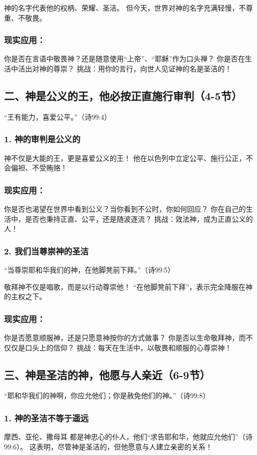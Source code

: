 \documentclass[a4paper, 12pt]{article}
\begin{document}
神的名字代表他的权柄、荣耀、圣洁。
但今天，世界对神的名字充满轻慢，不尊重、不敬畏。
\subsubsection*{现实应用：}

你是否在言语中敬畏神？还是随意使用“上帝”、“耶稣”作为口头禅？
你是否在生活中活出对神的尊崇？
挑战：用你的言行，向世人见证神的名是圣洁的！

\subsection*{二、神是公义的王，他必按正直施行审判（4-5节）}
“王有能力，喜爱公平。”（诗99:4）

\subsubsection*{1. 神的审判是公义的}
神不仅是大能的王，更是喜爱公义的王！
他在以色列中立定公平、施行公正，不会偏袒、不受贿赂！
\subsubsection*{现实应用：}

你是否也渴望在世界中看到公义？当你看到不公时，你如何回应？
你在自己的生活中，是否也秉持正直、公平，还是随波逐流？
挑战：效法神，成为正直公义的人！

\subsubsection*{2. 我们当尊崇神的圣洁}
“当尊崇耶和华我们的神，在他脚凳前下拜。”（诗99:5）

敬拜神不仅是唱歌，而是以行动尊崇他！
“在他脚凳前下拜”，表示完全降服在神的主权之下。
\subsubsection*{现实应用：}

你是否愿意顺服神，还是只愿意神按你的方式做事？
你是否以生命敬拜神，而不仅仅是口头上的信仰？
挑战：每天在生活中，以敬畏和顺服的心尊崇神！

\subsection*{三、神是圣洁的神，他愿与人亲近（6-9节）}
“耶和华我们的神啊，你应允他们；你是赦免他们的神。”（诗99:8）

\subsubsection*{1. 神的圣洁不等于遥远}
摩西、亚伦、撒母耳 都是神忠心的仆人，他们“求告耶和华，他就应允他们”（诗99:6）。
这表明，尽管神是圣洁的，但他愿意与人建立亲密的关系！
\end{document}
